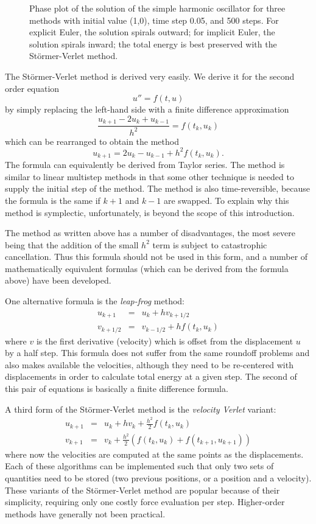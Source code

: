 \begin{figure}[htbp]
\begin{center}
{}
\caption{Phase plot of the solution of the simple harmonic oscillator for
three methods with initial value (1,0), time step 0.05, and 500 steps.  
For explicit Euler, the solution
spirals outward; for implicit Euler, the solution spirals inward; 
the total energy is best preserved with the St\"{o}rmer-Verlet method.}
\label{fig:integ}
\end{center}
\end{figure}

The St\"{o}rmer-Verlet method is derived very easily.  We derive it for the second order
equation
\[
u'' = f(t, u)
\]
by simply replacing the left-hand side with a finite difference approximation
\[
\frac{u_{k+1} - 2 u_k + u_{k-1}}{h^2} = f(t_k, u_k)
\]
which can be rearranged to obtain the method
\[
u_{k+1} = 2 u_k - u_{k-1} + h^2 f(t_k, u_k) .
\]
The formula can equivalently be derived from Taylor series.
The method is similar to linear multistep methods in that
some other technique is needed to supply the initial step of the method.  
The method is also time-reversible, because the formula is the same
if $k+1$ and $k-1$ are swapped.
To explain why this method is symplectic, 
unfortunately, is beyond the scope of this introduction.

The method as written above has a number of disadvantages, the most severe being
that the addition of the small $h^2$ term is subject to catastrophic cancellation.
Thus this formula should not be used in this form, and a number of mathematically
equivalent formulas (which can be derived from the formula above) have been developed.

One alternative formula is the {\em leap-frog} method:
\begin{eqnarray*}
u_{k+1} & = & u_k + h v_{k+1/2} \\
v_{k+1/2} & = & v_{k-1/2} + h f(t_k, u_k)
\end{eqnarray*}
where $v$ is the first derivative (velocity) which is offset from
the displacement $u$ by a half step.  This formula does not 
suffer from the same roundoff problems and also makes available the velocities,
although they need to be re-centered with displacements in order to calculate
total energy at a given step.
The second of this pair of equations is basically a finite difference formula.

A third form of the St\"{o}rmer-Verlet method is the {\em velocity Verlet}
variant:
\begin{eqnarray*}
u_{k+1} & = & u_k + h v_k + \frac{h^2}{2} f(t_k, u_k) \\
v_{k+1} & = & v_k + \frac{h^2}{2} (f(t_k, u_k) + f(t_{k+1}, u_{k+1}))
\end{eqnarray*}
where now the velocities are computed at the same points as the 
displacements.  Each of these algorithms can be implemented such
that only two sets of quantities need to be stored (two previous positions,
or a position and a velocity).
These variants of the St\"{o}rmer-Verlet method are popular because of
their simplicity, requiring only one costly force evaluation per step.
Higher-order methods have generally not been practical.

